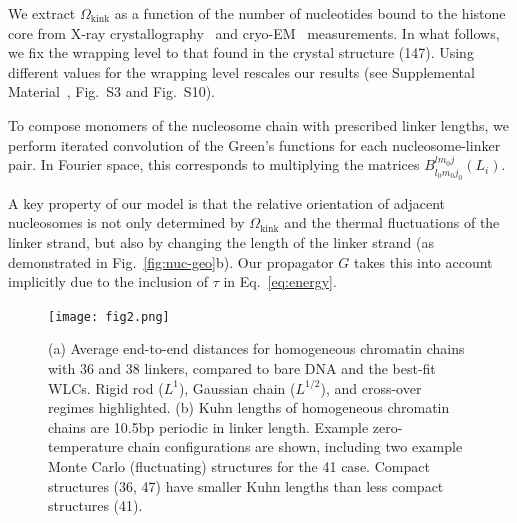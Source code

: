 \documentclass[%
 reprint,
superscriptaddress,
showpacs,preprintnumbers,
 amsmath,amssymb,
 aps,
 prl,
floatfix,
]{revtex4-1}
\begin{document}
We extract $\Omega_\text{kink}$ as a function of the number of nucleotides bound
to the histone core from X-ray crystallography~\cite{white2001,richmond2003,cutter2015a} and
    cryo-EM~\cite{bednar2017,bilokapic2018,eltsov2018,wakamori2015,zhou2015}
    measurements.
In what follows, we fix the wrapping level to that found in the crystal
    structure (\SI{147}{\basepair}).
Using different values for the wrapping level rescales our
    results (see Supplemental Material~\cite{supplemental}, Fig.~S3 and Fig.~S10).

To compose monomers of the nucleosome chain with prescribed linker lengths, we
    perform iterated convolution of the Green's functions for each
    nucleosome-linker pair.
In Fourier space, this corresponds to multiplying the matrices $B_{l_{0} m_{0} j_{0}}^{l m_0 j}(L_i)$.

A key property of our model is that the relative orientation of adjacent
    nucleosomes is not only determined by $\Omega_\text{kink}$ and the thermal
    fluctuations of the linker strand, but also by
changing the length of the
    linker strand (as demonstrated in Fig.~\ref{fig:nuc-geo}b).
Our propagator $G$ takes this into account implicitly due to the inclusion of $\tau$
    in Eq.~\ref{eq:energy}.

\begin{figure}[t]
    \centering
    \texttt{[image: fig2.png]}%
    \caption{(a) Average end-to-end distances for
    homogeneous chromatin chains with \SI{36}{\basepair} and \SI{38}{\basepair} linkers, compared to
    bare DNA and the best-fit WLCs. Rigid rod ($L^1$), Gaussian chain ($L^{1/2}$), and cross-over regimes highlighted.
    (b)
    Kuhn lengths of homogeneous chromatin
    chains are 10.5bp periodic in linker length.
    Example zero-temperature chain
    configurations are shown, including two example Monte Carlo (fluctuating) structures for the \SI{41}{\basepair} case.
    Compact structures (36, \SI{47}{\basepair}) {\color{red}have smaller Kuhn lengths} than less compact structures (\SI{41}{\basepair}).}
    \label{fig:homo-chain}
\end{figure}

\end{document}

